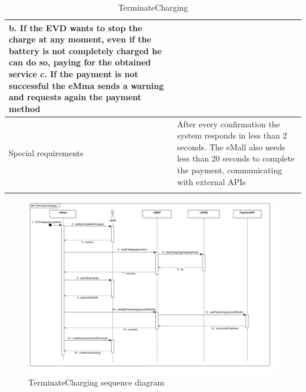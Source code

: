 \begin{center}
\begin{longtable}{p{4cm} p{11cm}}
        b. If the EVD wants to stop the charge at any moment, even if the battery is not completely charged he can do so, paying for the obtained service \newline
        c. If the payment is not successful the eMma sends a warning and requests again the payment method
        \\
     \hline
     Special requirements & After every confirmation the system responds in less than 2 seconds. The eMall also needs less than 20 seconds to complete the payment, communicating with external APIs \\
     \hline
    \caption{TerminateCharging}
    \label{tab:TerminateCharging}
    \end{longtable}
\end{center}
\begin{figure}[H]
    \centering
    \includegraphics[width=1\textwidth]{Images/cp3/seqDiagrams/TerminateCharging.png}
    \caption{TerminateCharging sequence diagram}
\end{figure}

